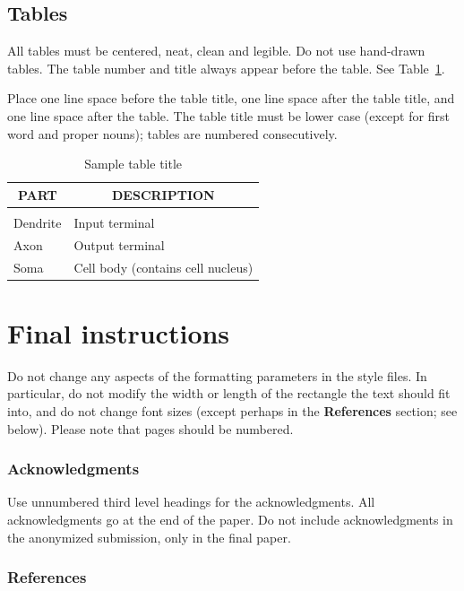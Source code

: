 \documentclass{article} %
\begin{document}
\subsection{Tables}

All tables must be centered, neat, clean and legible. Do not use hand-drawn
tables. The table number and title always appear before the table. See
Table~\ref{sample-table}.

Place one line space before the table title, one line space after the table
title, and one line space after the table. The table title must be lower case
(except for first word and proper nouns); tables are numbered consecutively.

\begin{table}[t]
\caption{Sample table title}
\label{sample-table}
\begin{center}
\begin{tabular}{ll}
\multicolumn{1}{c}{\bf PART}  &\multicolumn{1}{c}{\bf DESCRIPTION}
\\ \hline \\
Dendrite         &Input terminal \\
Axon             &Output terminal \\
Soma             &Cell body (contains cell nucleus) \\
\end{tabular}
\end{center}
\end{table}

\section{Final instructions}
Do not change any aspects of the formatting parameters in the style files.
In particular, do not modify the width or length of the rectangle the text
should fit into, and do not change font sizes (except perhaps in the
\textbf{References} section; see below). Please note that pages should be
numbered.

\subsubsection*{Acknowledgments}

Use unnumbered third level headings for the acknowledgments. All
acknowledgments go at the end of the paper. Do not include 
acknowledgments in the anonymized submission, only in the 
final paper. 

\subsubsection*{References}
\end{document}
